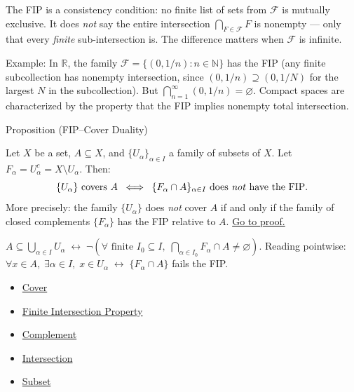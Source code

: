 \begin{remark*}
The FIP is a consistency condition: no finite list of sets from $\mathcal{F}$
is mutually exclusive. It does \emph{not} say the entire intersection
$\bigcap_{F \in \mathcal{F}} F$ is nonempty — only that every \emph{finite}
sub-intersection is. The difference matters when $\mathcal{F}$ is infinite.

Example: In $\mathbb{R}$, the family $\mathcal{F} = \{(0, 1/n) : n \in
\mathbb{N}\}$ has the FIP (any finite subcollection has nonempty intersection,
since $(0, 1/n) \supseteq (0, 1/N)$ for the largest $N$ in the subcollection).
But $\bigcap_{n=1}^\infty (0,1/n) = \varnothing$. Compact spaces are
characterized by the property that the FIP implies nonempty total
intersection.
\end{remark*}


\begin{propositionbox}{Proposition (FIP--Cover Duality)}
\begin{proposition}\label{prop:fip-duality}
Let $X$ be a set, $A \subseteq X$, and $\{U_\alpha\}_{\alpha \in I}$ a
family of subsets of $X$. Let $F_\alpha = U_\alpha^c = X \setminus U_\alpha$.
Then:
\[
\{U_\alpha\} \text{ covers } A
\;\;\Longleftrightarrow\;\;
\{F_\alpha \cap A\}_{\alpha \in I} \text{ does \emph{not} have the FIP}.
\]
More precisely: the family $\{U_\alpha\}$ does \emph{not} cover $A$ if and
only if the family of closed complements $\{F_\alpha\}$ has the FIP relative
to $A$.
\hyperref[prf:fip-duality]{Go to proof.}
\end{proposition}
\end{propositionbox}

\begin{remark*}
$A \subseteq \bigcup_{\alpha \in I} U_\alpha \;\leftrightarrow\; \neg(\forall\text{ finite }I_0\subseteq I,\; \bigcap_{\alpha\in I_0} F_\alpha \cap A \neq \varnothing)$. Reading pointwise: $\forall x\in A,\;\exists\alpha\in I,\; x\in U_\alpha \;\leftrightarrow\; \{F_\alpha\cap A\}$ fails the FIP.
\end{remark*}


\begin{dependencies}
\begin{itemize}
  \item \hyperref[def:cover-full]{Cover}
  \item \hyperref[def:fip]{Finite Intersection Property}
  \item \hyperref[def:complement]{Complement}
  \item \hyperref[def:intersection]{Intersection}
  \item \hyperref[def:subset]{Subset}
\end{itemize}
\end{dependencies}

